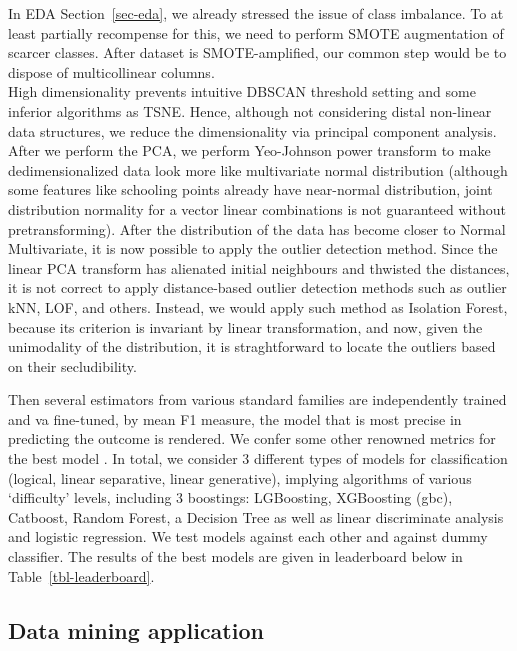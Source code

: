 \documentclass[
  letterpaper,
  DIV=11,
  numbers=noendperiod]{scrartcl}
\begin{document}
In EDA Section~\ref{sec-eda}, we already stressed the issue of class
imbalance. To at least partially recompense for this, we need to perform
SMOTE augmentation of scarcer classes. After dataset is SMOTE-amplified,
our common step would be to dispose of multicollinear columns.\\
High dimensionality prevents intuitive DBSCAN threshold setting and some
inferior algorithms as TSNE. Hence, although not considering distal
non-linear data structures, we reduce the dimensionality via principal
component analysis. After we perform the PCA, we perform Yeo-Johnson
power transform to make dedimensionalized data look more like
multivariate normal distribution (although some features like schooling
points already have near-normal distribution, joint distribution
normality for a vector linear combinations is not guaranteed without
pretransforming). After the distribution of the data has become closer
to Normal Multivariate, it is now possible to apply the outlier
detection method. Since the linear PCA transform has alienated initial
neighbours and thwisted the distances, it is not correct to apply
distance-based outlier detection methods such as outlier kNN, LOF, and
others. Instead, we would apply such method as Isolation Forest, because
its criterion is invariant by linear transformation, and now, given the
unimodality of the distribution, it is straghtforward to locate the
outliers based on their secludibility.

Then several estimators from various standard families are independently
trained and va fine-tuned, by mean F1 measure, the model that is most
precise in predicting the outcome is rendered. We confer some other
renowned metrics for the best model . In total, we consider 3 different
types of models for classification (logical, linear separative, linear
generative), implying algorithms of various \enquote*{difficulty}
levels, including 3 boostings: LGBoosting, XGBoosting (gbc), Catboost,
Random Forest, a Decision Tree as well as linear discriminate analysis
and logistic regression. We test models against each other and against
dummy classifier. The results of the best models are given in
leaderboard below in Table~\ref{tbl-leaderboard}.

\hypertarget{data-mining-application}{%
\subsection{Data mining application}\label{data-mining-application}}
\end{document}
